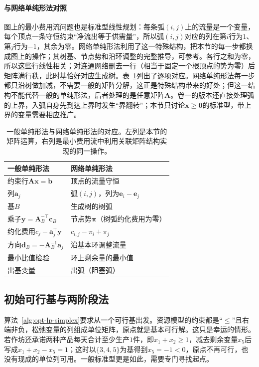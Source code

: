 \paragraph{与网络单纯形法对照}
图上的最小费用流问题也是标准型线性规划：每条弧$(i,j)$上的流量是一个变量，每个顶点一条守恒约束“净流出等于供需量”，所以弧$(i,j)$对应的列在第$i$行为$1$、第$j$行为$-1$，其余为零。网络单纯形法利用了这一特殊结构，把本节的每一步都换成图上的操作；其树基、节点势和沿环调整的完整推导，可参考。各行之和为零，所以这些行线性相关；对连通网络删去一行（相当于固定一个根顶点的势为零）后矩阵满行秩，此时基恰好对应生成树。表~\ref{tab:opt-lp-network-simplex}列出了逐项对应。网络单纯形法每一步都只沿树做加减，不需要一般的矩阵分解，这正是特殊结构带来的好处；但这一结构不能代替一般的单纯形法，后者处理的是任意矩阵$\bm A$。卷一的版本还直接处理弧的上界，入弧自身先到达上界时发生“界翻转”；本节只讨论$\bm x\ge\bm 0$的标准型，带上界的变量需要相应推广。

\begin{table}[!htbp]
  \centering
  \caption{一般单纯形法与网络单纯形法的对应。左列是本节的矩阵运算，右列是最小费用流中利用关联矩阵结构实现的同一操作。}
  \label{tab:opt-lp-network-simplex}
  \begin{tabular}{@{}ll@{}}
    \toprule
    一般单纯形法 & 网络单纯形法 \\
    \midrule
    约束行$\bm A\bm x=\bm b$ & 顶点的流量守恒 \\
    列$\bm a_j$ & 弧$(i,j)$，列为$\bm e_i-\bm e_j$ \\
    基$B$ & 生成树的树弧 \\
    乘子$\bm y=\bm A_B^{-\top}\bm c_B$ & 节点势$\bm\pi$（树弧约化费用为零） \\
    约化费用$c_j-\bm a_j^\top\bm y$ & $c_{i,j}-\pi_i+\pi_j$ \\
    方向$\bm d_B=-\bm A_B^{-1}\bm a_j$ & 沿基本环调整流量 \\
    最小比值检验 & 环上剩余量的最小值 \\
    出基变量 & 出弧（阻塞弧） \\
    \bottomrule
  \end{tabular}
\end{table}

\subsection{初始可行基与两阶段法}
\label{sec:opt-lp-two-phase}

算法~\ref{alg:opt-lp-simplex}要求从一个可行基出发。资源模型的约束都是“$\le$”且右端非负，松弛变量的列组成单位矩阵，原点就是基本可行解。这只是幸运的情形。若作坊还承诺两种产品每天合计至少生产$1$件，即$x_1+x_2\ge1$，减去剩余变量$x_5$后写成$x_1+x_2-x_5=1$；这时以$\{3,4,5\}$为基得到$x_5=-1<0$，原点不再可行，也没有现成的单位列可用。一般标准型更是如此，需要专门寻找起点。

